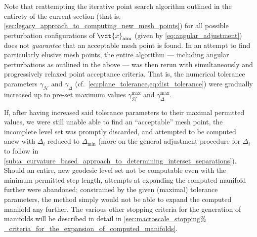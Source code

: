 Note that reattempting the iterative point search algorithm outlined in
the entirety of the current section (that is,
\cref{sec:legacy_approach_to_computing_new_mesh_points}) for all possible
perturbation configurations of $\vct{x}_{\text{aim}}$ (given by
\cref{eq:angular_adjustment}) does not \emph{guarantee} that an
acceptable mesh point is found. In an attempt to find particularly elusive mesh
points, the entire algorithm --- including angular perturbations as outlined in
the above --- was then rerun with simultaneously and progressively relaxed
point acceptance criteria. That is, the numerical tolerance parameters
$\gamma_{\mathcal{H}}$ and $\gamma_{\Delta}$ (cf.\
\cref{eq:plane_tolerance,eq:dist_tolerance}) were gradually increased up to
pre-set maximum values $\gamma_{\mathcal{H}}^{\max}$ and
$\gamma_{\Delta}^{\max}$.

If, after having increased said tolerance parameters to their maximal
permitted values, we were still unable able to find an ``acceptable'' mesh
point, the incomplete level set was promptly discarded, and attempted to be
computed anew with $\Delta_{i}$ reduced to $\Delta_{\min}$ (more on the general
adjustment procedure for $\Delta_{i}$ to follow in
\cref{sub:a_curvature_based_approach_to_determining_interset_separations}).
Should an entire, new geodesic level set not be computable even with the
minimum permitted step length, attempts at expanding the computed manifold
further were abandoned; constrained by the given (maximal) tolerance
parameters, the method simply would not be able to expand the computed manifold
any further. The various other stopping criteria for the generation of
manifolds will be described in detail in \cref{sec:macroscale_stopping%
_criteria_for_the_expansion_of_computed_manifolds}.
